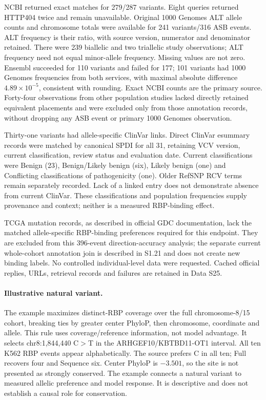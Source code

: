 NCBI returned exact matches for 279/287 variants. Eight queries returned HTTP404 twice and remain unavailable. Original 1000 Genomes ALT allele counts and chromosome totals were available for 241 variants/316 ASB events. ALT frequency is their ratio, with source version, numerator and denominator retained. There were 239 biallelic and two triallelic study observations; ALT frequency need not equal minor-allele frequency. Missing values are not zero. Ensembl succeeded for 110 variants and failed for 177; 101 variants had 1000 Genomes frequencies from both services, with maximal absolute difference $4.89\times10^{-5}$, consistent with rounding. Exact NCBI counts are the primary source. Forty-four observations from other population studies lacked directly retained equivalent placements and were excluded only from those annotation records, without dropping any ASB event or primary 1000 Genomes observation.

Thirty-one variants had allele-specific ClinVar links. Direct ClinVar esummary records were matched by canonical SPDI for all 31, retaining VCV version, current classification, review status and evaluation date. Current classifications were Benign (23), Benign/Likely benign (six), Likely benign (one) and Conflicting classifications of pathogenicity (one). Older RefSNP RCV terms remain separately recorded. Lack of a linked entry does not demonstrate absence from current ClinVar. These classifications and population frequencies supply provenance and context; neither is a measured RBP-binding effect.

TCGA mutation records, as described in official GDC documentation, lack the matched allele-specific RBP-binding preferences required for this endpoint. They are excluded from this 396-event direction-accuracy analysis; the separate current whole-cohort annotation join is described in S1.21 and does not create new binding labels. No controlled individual-level data were requested. Cached official replies, URLs, retrieval records and failures are retained in Data S25.

\paragraph{Illustrative natural variant.} The example maximizes distinct-RBP coverage over the full chromosome-8/15 cohort, breaking ties by greater center PhyloP, then chromosome, coordinate and allele. This rule uses coverage/reference information, not model advantage. It selects chr8:1,844,440 C$>$T in the ARHGEF10/KBTBD11-OT1 interval. All ten K562 RBP events appear alphabetically. The source prefers C in all ten; Full recovers four and Sequence six. Center PhyloP is $-3.501$, so the site is not presented as strongly conserved. The example connects a natural variant to measured allelic preference and model response. It is descriptive and does not establish a causal role for conservation.


